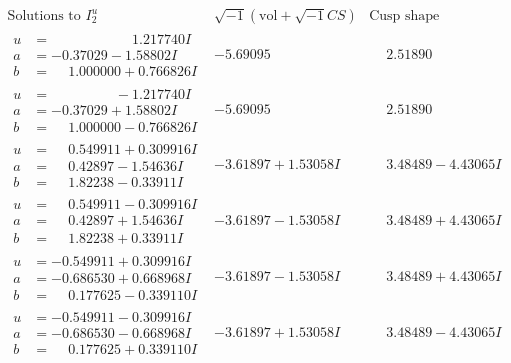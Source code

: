 \documentclass[1p]{elsarticle_modified}
\theoremstyle{definition}
\newcommand{\I}{\sqrt{-1}}
\begin{document}
$$\begin{array}{c|c|c}  
\text{Solutions to }I^u_{2}& \I (\text{vol} + \sqrt{-1}CS) & \text{Cusp shape}\\
 \hline 
\begin{aligned}
u &= \phantom{-0.000000 -}1.217740 I \\
a &= -0.37029 - 1.58802 I \\
b &= \phantom{-}1.000000 + 0.766826 I\end{aligned}
 & -5.69095\phantom{ +0.000000I} & \phantom{-}2.51890\phantom{ +0.000000I} \\ \hline\begin{aligned}
u &= \phantom{-0.000000 } -1.217740 I \\
a &= -0.37029 + 1.58802 I \\
b &= \phantom{-}1.000000 - 0.766826 I\end{aligned}
 & -5.69095\phantom{ +0.000000I} & \phantom{-}2.51890\phantom{ +0.000000I} \\ \hline\begin{aligned}
u &= \phantom{-}0.549911 + 0.309916 I \\
a &= \phantom{-}0.42897 - 1.54636 I \\
b &= \phantom{-}1.82238 - 0.33911 I\end{aligned}
 & -3.61897 + 1.53058 I & \phantom{-}3.48489 - 4.43065 I \\ \hline\begin{aligned}
u &= \phantom{-}0.549911 - 0.309916 I \\
a &= \phantom{-}0.42897 + 1.54636 I \\
b &= \phantom{-}1.82238 + 0.33911 I\end{aligned}
 & -3.61897 - 1.53058 I & \phantom{-}3.48489 + 4.43065 I \\ \hline\begin{aligned}
u &= -0.549911 + 0.309916 I \\
a &= -0.686530 + 0.668968 I \\
b &= \phantom{-}0.177625 - 0.339110 I\end{aligned}
 & -3.61897 - 1.53058 I & \phantom{-}3.48489 + 4.43065 I \\ \hline\begin{aligned}
u &= -0.549911 - 0.309916 I \\
a &= -0.686530 - 0.668968 I \\
b &= \phantom{-}0.177625 + 0.339110 I\end{aligned}
 & -3.61897 + 1.53058 I & \phantom{-}3.48489 - 4.43065 I \\ \hline\begin{aligned}

\end{aligned}
\end{array}$$
\end{document}
